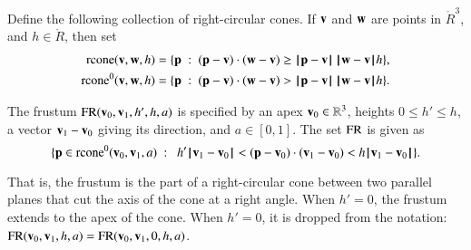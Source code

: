 \begin{definition}[rcone]\label{def:p:rcone}
%
Define the following collection of right-circular cones.
If ${\mathbf v}$ and ${\mathbf w}$ are points in $\ring{R}^3$, and
$h\in\ring{R}$, then set
\begin{align*}
\op{rcone}(\v,\w,h) 
&= \{\p\mid (\p-\v)\cdot (\w-\v) \ge \norm{\p}{\v}\,\norm{\w}{\v} h\},\\
\op{rcone}^0(\v,\w,h) 
&= \{\p\mid (\p-\v)\cdot (\w-\v) > \norm{\p}{\v}\,\norm{\w}{\v} h\}.\\
\end{align*}
\end{definition}
%
%
%
%


\begin{definition}[frustum, FR]
 The frustum
${\operatorname{FR}}({\mathbf v}_0,{\mathbf v}_1,h',h,a)$ is specified by an apex
${\mathbf v}_0\in\mathbb{R}^3$, heights $0\le h'\le h$, a vector ${\mathbf v}_1-{\mathbf v}_0$
giving its direction, and $a\in[0,1]$. The set ${\operatorname{FR}}$ is given as
\[ 
\{ \p \in\op{rcone}^0(\v_0,\v_1,a) \mid \ 
h'\norm{\v_1}{\v_0} < (\p-\v_0) \cdot (\v_1-\v_0) < h\norm{\v_1}{\v_0} \}.
\] 
%
%
%
\end{definition}

That is, the frustum is the part of a right-circular cone between two
parallel planes that cut the axis of the cone at a right angle.  When
$h'=0$, the frustum extends to the apex of the cone.  When $h'=0$, it
is dropped from the notation:
${\operatorname{FR}}({\mathbf v}_0,{\mathbf v}_1,h,a)={\operatorname{FR}}({\mathbf v}_0,{\mathbf v}_1,0,h,a)$.

%

